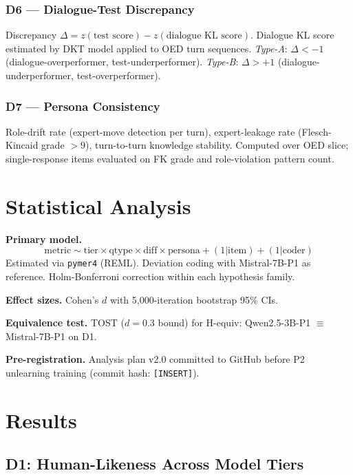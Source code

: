 \documentclass[10pt,twocolumn]{IEEEtran}
\begin{document}
\subsubsection*{D6 — Dialogue-Test Discrepancy}
Discrepancy $\Delta = z(\text{test score}) - z(\text{dialogue KL score})$.
Dialogue KL score estimated by DKT model applied to OED turn sequences.
\textit{Type-A}: $\Delta < -1$ (dialogue-overperformer, test-underperformer).
\textit{Type-B}: $\Delta > +1$ (dialogue-underperformer, test-overperformer).

\subsubsection*{D7 — Persona Consistency}
Role-drift rate (expert-move detection per turn), expert-leakage rate
(Flesch-Kincaid grade $> 9$), turn-to-turn knowledge stability.
Computed over OED slice; single-response items evaluated on FK grade and
role-violation pattern count.

\section{Statistical Analysis}

\textbf{Primary model.}
\begin{equation}
\text{metric} \sim \text{tier} \times \text{qtype} \times \text{diff} \times \text{persona}
  + (1|\text{item}) + (1|\text{coder})
\end{equation}
Estimated via \texttt{pymer4} (REML). Deviation coding with Mistral-7B-P1 as reference.
Holm-Bonferroni correction within each hypothesis family.

\textbf{Effect sizes.} Cohen's $d$ with 5,000-iteration bootstrap 95\% CIs.

\textbf{Equivalence test.} TOST ($d = 0.3$ bound) for H-equiv:
Qwen2.5-3B-P1 $\equiv$ Mistral-7B-P1 on D1.

\textbf{Pre-registration.} Analysis plan v2.0 committed to GitHub before P2
unlearning training (commit hash: \texttt{[INSERT]}).

\section{Results}

\subsection{D1: Human-Likeness Across Model Tiers}
\end{document}
